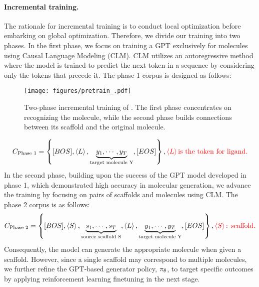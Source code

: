 \paragraph{Incremental training.} 
The rationale for incremental training is to conduct local optimization before embarking on global optimization. Therefore, we divide our training into two phases.
In the first phase, we focus on training a GPT exclusively for molecules using Causal Language Modeling (CLM). CLM utilizes an autoregressive method where the model is trained to predict the next token in a sequence by considering only the tokens that precede it. The phase 1 corpus is designed as follows:
\begin{figure*}[t]
        \centering
        \texttt{[image: figures/pretrain\_.pdf]}
    \caption{
    Two-phase incremental training of \algname. The first phase concentrates on recognizing the molecule, while the second phase builds connections between its scaffold and the original molecule.
    }
  \label{fig:drugimprover_framework}
\end{figure*}
\begin{equation}\label{eq:phase1_corpus}
C_{\text{Phase 1}}=\left\{[BOS],\left\langle L \right\rangle,\underbrace{y_1,\cdots,y_{T}}_{\text{target molecule Y}},[EOS]\right\}, {\color{red} \left\langle L \right\rangle \text{is the token for ligand.}}
\end{equation}
In the second phase, building upon the success of the GPT model developed in phase 1, which demonstrated high accuracy in molecular generation, we advance the training by focusing on pairs of scaffolds and molecules using CLM. The phase 2 corpus is as follows:
\begin{align}\label{eq:phase2_corpus}
C_{\text{Phase 2}}=\left\{[BOS],\left\langle S \right\rangle,\underbrace{s_1,\cdots,s_{T}}_{\text{source scaffold S}},\left\langle L \right\rangle,\underbrace{y_1,\cdots,y_{T}}_{\text{target molecule Y}},[EOS]\right\}, {\color{red} \left\langle S \right\rangle \text{: scaffold.}}
\end{align}
Consequently, the model can generate the appropriate molecule when given a scaffold. However, since a single scaffold may correspond to multiple molecules, we further refine the GPT-based generator policy, $\pi_{\theta}$, to target specific outcomes by applying reinforcement learning finetuning in the next stage.










